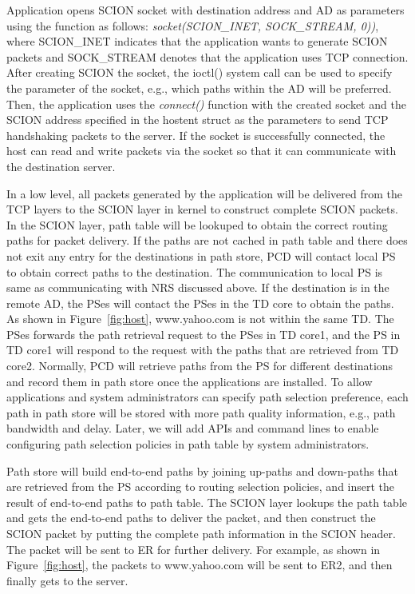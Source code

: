 Application opens SCION socket with destination address and AD as
parameters using the function as follows: {\em socket(SCION\_INET,
SOCK\_STREAM, 0))}, where SCION\_INET indicates that the application
wants to generate SCION packets and SOCK\_STREAM denotes that the
application uses TCP connection. After creating SCION the socket,
the ioctl() system call can be used to specify the parameter of the
socket, e.g., which paths within the AD will be preferred. Then, the
application uses the {\em connect()} function with the created
socket and the SCION address specified in the hostent struct as the
parameters to send TCP handshaking packets to the server. If the
socket is successfully connected, the host can read and write
packets via the socket so that it can communicate with the
destination server.

In a low level, all packets generated by the application will be
delivered from the TCP layers to the SCION layer in kernel to
construct complete SCION packets. In the SCION layer, path table
will be lookuped to obtain the correct routing paths for packet
delivery. If the paths are not cached in path table and there does
not exit any entry for the destinations in path store, PCD will
contact local PS to obtain correct paths to the destination. The
communication to local PS is same as communicating with NRS
discussed above. If the destination is in the remote AD, the PSes
will contact the PSes in the TD core to obtain the paths. As shown
in Figure~\ref{fig:host}, www.yahoo.com is not within the same TD.
The PSes forwards the path retrieval request to the PSes in TD
core1, and the PS in TD core1 will respond to the request with the
paths that are retrieved from TD core2. Normally, PCD will retrieve
paths from the PS for different destinations and record them in path
store once the applications are installed. To allow applications and
system administrators can specify path selection preference, each
path in path store will be stored with more path quality
information, e.g., path bandwidth and delay.
Later, we will add APIs and command lines to enable configuring path
selection policies in path table by system administrators.

Path store will build end-to-end paths by joining up-paths and
down-paths that are retrieved from the PS according to routing
selection policies, and insert the result of end-to-end paths to
path table. The SCION layer lookups the path table and gets the
end-to-end paths to deliver the packet, and then construct the SCION
packet by putting the complete path information in the SCION header. %
The packet will be sent to ER for further delivery. For example, as
shown in Figure~\ref{fig:host}, the packets to www.yahoo.com will be
sent to ER2, and then finally gets to the server.

